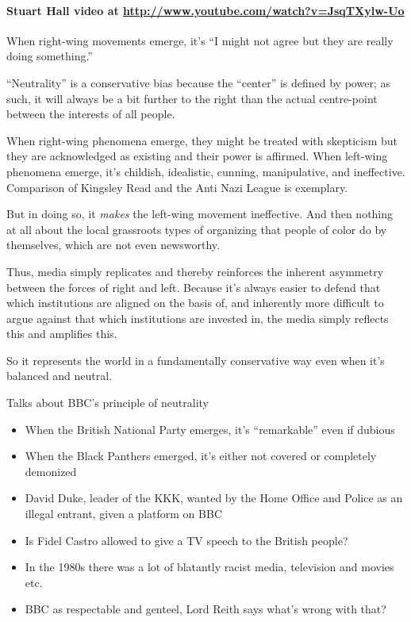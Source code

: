 \documentclass[12pt,book]{article}
\begin{document}
\paragraph{Stuart Hall video at
\url{http://www.youtube.com/watch?v=JsqTXylw-Uo}}\label{stuart-hall-video-at-httpwww.youtube.comwatchvjsqtxylw-uo}

When right-wing movements emerge, it's ``I might not agree but they are
really doing something.''

``Neutrality'' is a conservative bias because the ``center'' is defined
by power; as such, it will always be a bit further to the right than the
actual centre-point between the interests of all people.

When right-wing phenomena emerge, they might be treated with skepticism
but they are acknowledged as existing and their power is affirmed. When
left-wing phenomena emerge, it's childish, idealistic, cunning,
manipulative, and ineffective. Comparison of Kingsley Read and the Anti
Nazi League is exemplary.

But in doing so, it \emph{makes} the left-wing movement ineffective. And
then nothing at all about the local grassroots types of organizing that
people of color do by themselves, which are not even newsworthy.

Thus, media simply replicates and thereby reinforces the inherent
asymmetry between the forces of right and left. Because it's always
easier to defend that which institutions are aligned on the basis of,
and inherently more difficult to argue against that which institutions
are invested in, the media simply reflects this and amplifies this.

So it represents the world in a fundamentally conservative way even when
it's balanced and neutral.

Talks about BBC's principle of neutrality

\begin{itemize}
\item
  When the British National Party emerges, it's ``remarkable'' even if
  dubious
\item
  When the Black Panthers emerged, it's either not covered or completely
  demonized
\item
  David Duke, leader of the KKK, wanted by the Home Office and Police as
  an illegal entrant, given a platform on BBC
\item
  Is Fidel Castro allowed to give a TV speech to the British people?
\item
  In the 1980s there was a lot of blatantly racist media, television and
  movies etc.
\item
  BBC as respectable and genteel, Lord Reith says what's wrong with
  that?
\end{itemize}
\end{document}
